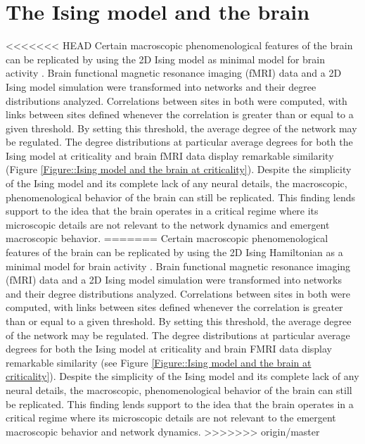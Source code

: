 \documentclass[12pt]{article}
\begin{document}
\section*{The Ising model and the brain}
<<<<<<< HEAD
Certain macroscopic phenomenological features of the brain can be replicated by using the 2D Ising model as minimal model for brain activity \cite{Fraiman2009a}. Brain functional magnetic resonance imaging (fMRI) data and a 2D Ising model simulation were transformed into networks and their degree distributions analyzed. Correlations between sites in both were computed, with links between sites defined whenever the correlation is greater than or equal to a given threshold. By setting this threshold, the average degree of the network may be regulated. The degree distributions at particular average degrees for both the Ising model at criticality and brain fMRI data display remarkable similarity (Figure \ref{Figure::Ising model and the brain at criticality}). Despite the simplicity of the Ising model and its complete lack of any neural details, the macroscopic, phenomenological behavior of the brain can still be replicated. This finding lends support to the idea that the brain operates in a critical regime where its microscopic details are not relevant to the network dynamics and emergent macroscopic behavior.
=======
Certain macroscopic phenomenological features of the brain can be replicated by using the 2D Ising Hamiltonian as a minimal model for brain activity \cite{Fraiman2009a}. Brain functional magnetic resonance imaging (fMRI) data and a 2D Ising model simulation were transformed into networks and their degree distributions analyzed. Correlations between sites in both were computed, with links between sites defined whenever the correlation is greater than or equal to a given threshold. By setting this threshold, the average degree of the network may be regulated. The degree distributions at particular average degrees for both the Ising model at criticality and brain FMRI data display remarkable similarity (see Figure \ref{Figure::Ising model and the brain at criticality}). Despite the simplicity of the Ising model and its complete lack of any neural details, the macroscopic, phenomenological behavior of the brain can still be replicated. This finding lends support to the idea that the brain operates in a critical regime where its microscopic details are not relevant to the emergent macroscopic behavior and network dynamics.
>>>>>>> origin/master
\end{document}
